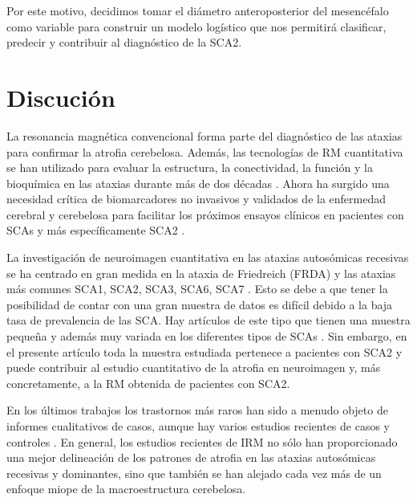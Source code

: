 \documentclass[a4paper,12pt]{article}
\begin{document}
Por este motivo, decidimos tomar el diámetro anteroposterior del mesencéfalo como variable para construir un modelo logístico que nos permitirá clasificar, predecir y contribuir al diagnóstico de la SCA2.




\section{Discución \label{sec}}

La resonancia magnética convencional forma parte del diagnóstico de las ataxias para confirmar la atrofia cerebelosa. Además, las tecnologías de RM cuantitativa se han utilizado para evaluar la estructura, la conectividad, la función y la bioquímica en las ataxias durante más de dos décadas \cite{oz_mr_2020,dogan_structural_2019,ashizawa_spinocerebellar_2018}. Ahora ha surgido una necesidad crítica de biomarcadores no invasivos y validados de la enfermedad cerebral y cerebelosa para facilitar los próximos ensayos clínicos en pacientes con SCAs y más específicamente SCA2 \cite{klockgether_spinocerebellar_2019}. 

La investigación de neuroimagen cuantitativa en las ataxias autosómicas recesivas se ha centrado en gran medida en la ataxia de Friedreich (FRDA) y las ataxias más comunes SCA1, SCA2, SCA3, SCA6, SCA7 . Esto se debe a que tener la posibilidad de contar con una gran muestra de datos es difícil debido a la baja tasa de prevalencia de las SCA. Hay artículos de este tipo que tienen una muestra pequeña y además muy variada en los diferentes tipos de SCAs \cite{j_alberto_cuesta_search_2022, faber_regional_2021,xie_quantitative_2020,brockmann_pet_2012,lindig_pattern_2019,li_neurofilament_2019}. Sin embargo, en el presente artículo toda la muestra estudiada pertenece a pacientes con SCA2 y puede contribuir al estudio cuantitativo de la atrofia en neuroimagen y, más concretamente, a la RM obtenida de pacientes con SCA2.   

En los últimos trabajos los trastornos más raros han sido a menudo objeto de informes cualitativos de casos, aunque hay varios estudios recientes de casos y controles \cite{selvadurai_multiple_2020,yang_lung_2022,yang_metabolic_2019,yap_magnetic_2022,rezende_developmental_2019}. En general, los estudios recientes de IRM no sólo han proporcionado una mejor delineación de los patrones de atrofia en las ataxias autosómicas recesivas y dominantes, sino que también se han alejado cada vez más de un enfoque miope de la macroestructura cerebelosa. 
\end{document}
